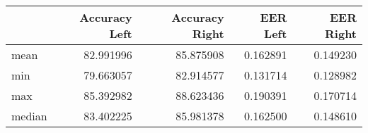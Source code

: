 \begin{tabular}{lrrrr}
\toprule
{} &  Accuracy Left &  Accuracy Right &  EER Left &  EER Right \\
\midrule
mean   &      82.991996 &       85.875908 &  0.162891 &   0.149230 \\
min    &      79.663057 &       82.914577 &  0.131714 &   0.128982 \\
max    &      85.392982 &       88.623436 &  0.190391 &   0.170714 \\
median &      83.402225 &       85.981378 &  0.162500 &   0.148610 \\
\bottomrule
\end{tabular}
